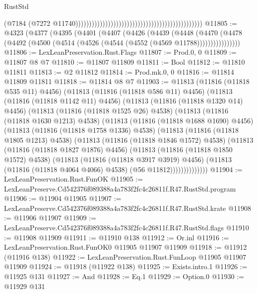 \begin{lexlean}{RustStd}
\begin{coremodule}
                                                                                              (@7184
                                                                                                (@7272
                                                                                                  @11740)))))))))))))))))))))))))))))))))))))))))))))))
@11805 := @4323
    (@4377
      (@4395
        (@4401
          (@4407
            (@4426
              (@4439
                (@4448
                  (@4470
                    (@4478 (@4492 (@4500 (@4514 (@4526 (@4544 (@4552 (@4569 @11788))))))))))))))))
@11806 := LexLeanPreservation.Rust.Flags
@11807 := Prod.{0, 0}
@11809 := @11807 @8 @7
@11810 := @11807 @11809
@11811 := Bool
@11812 := @11810 @11811
@11813 := @2 @11812
@11814 := Prod.mk.{0, 0}
@11816 := @11814 @11809 @11811
@11818 := @11814 @8 @7
@11903 := @11813
    (@11816 (@11818 @535 @11) @4456)
    (@11813
      (@11816 (@11818 @586 @11) @4456)
      (@11813
        (@11816 (@11818 @1142 @11) @4456)
        (@11813
          (@11816 (@11818 @1320 @14) @4456)
          (@11813
            (@11816 (@11818 @1525 @26) @4538)
            (@11813
              (@11816 (@11818 @1630 @1213) @4538)
              (@11813
                (@11816 (@11818 @1688 @1690) @4456)
                (@11813
                  (@11816 (@11818 @1758 @1336) @4538)
                  (@11813
                    (@11816 (@11818 @1805 @1213) @4538)
                    (@11813
                      (@11816 (@11818 @1846 @1572) @4538)
                      (@11813
                        (@11816 (@11818 @1827 @1876) @4456)
                        (@11813
                          (@11816 (@11818 @1850 @1572) @4538)
                          (@11813
                            (@11816 (@11818 @3917 @3919) @4456)
                            (@11813 (@11816 (@11818 @4064 @4066) @4538) (@56 @11812))))))))))))))
@11904 := LexLeanPreservation.Rust.FunOK
@11905 := LexLeanPreserve.Cd542376f089388a4a783f2fc4c26811f.R47.RustStd.program
@11906 := @11904 @11905
@11907 := LexLeanPreserve.Cd542376f089388a4a783f2fc4c26811f.R47.RustStd.krate
@11908 := @11906 @11907
@11909 := LexLeanPreserve.Cd542376f089388a4a783f2fc4c26811f.R47.RustStd.flags
@11910 := @11908 @11909
@11911 := @11910 @138
@11912 := Or.inl
@11916 := LexLeanPreservation.Rust.FunOK0 @11905 @11907 @11909
@11918 := @11912 (@11916 @138)
@11922 := LexLeanPreservation.Rust.FunLoop @11905 @11907 @11909
@11924 := @11918 (@11922 @138)
@11925 := Exists.intro.{1}
@11926 := @11925 @131
@11927 := And
@11928 := Eq.{1}
@11929 := Option.{0}
@11930 := @11929 @131

\end{coremodule}
\end{lexlean}
